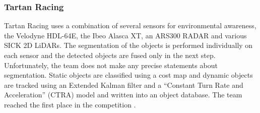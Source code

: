 \documentclass[11pt,oneside,openright]{mpreport}
\begin{document}
\subsubsection{Tartan Racing}
Tartan Racing \cite{Urmson2007} uses a combination of several sensors for environmental awareness, the Velodyne HDL-64E, the Ibeo Alasca XT, an ARS300 RADAR and various SICK 2D LiDARs.
The segmentation of the objects is performed individually on each sensor and the detected objects are fused only in the next step. Unfortunately,
the team does not make any precise statements about segmentation. Static objects are classified using a cost map and dynamic objects are tracked using an
Extended Kalman filter and a ``Constant Turn Rate and Acceleration'' (CTRA) model and written into an object database. The team reached the first place in the competition \cite{Release2007}.
\end{document}
